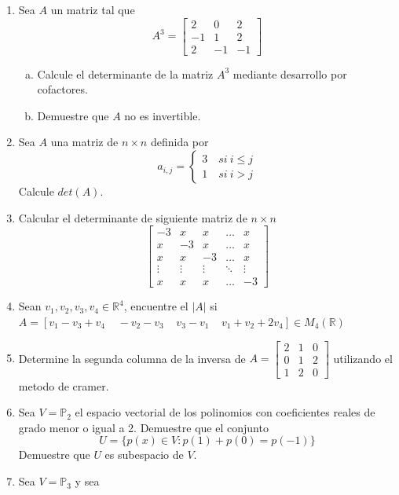 \documentclass[12pt]{article}
\newenvironment{preguntas}
{\begin{enumerate}\itemsep12pt
	}
	{
	\end{enumerate}
}
\newcommand{\ra}{\rightarrow}
\newcommand{\R}{\mathbb{R}}
\begin{document}
\begin{preguntas}
\begin{enumerate}[a)]
\item Se define $T: \R^3 \ra \R^3$ como la transformación lineal definida por $$T(x,y,z)=(x+y,y+z,x-z)$$
		Calcule el volumen de $T(P)$.
\end{enumerate}
\item Sea $A$ un matriz tal que
$$A^3 = 
\begin{bmatrix}
2 & 0 & 2\\
-1 & 1 & 2\\
2 & -1 & -1
\end{bmatrix}$$
\begin{enumerate}[a)]
\item Calcule el determinante de la matriz $A^3$ mediante desarrollo por cofactores.
\item Demuestre que $A$ no es invertible.
\end{enumerate}
\item Sea $A$ una matriz de $n \times n$ definida por
	$$a_{i,j} = 
	\begin{cases}
	3 \quad si\ i\leq j \\
	1 \quad si\ i > j
	\end{cases}$$
	Calcule $det(A)$.
\item Calcular el determinante de siguiente matriz de $n\times n$
	$$ \begin{bmatrix}
	-3 & x & x & \dots & x \\
	x & -3 & x & \dots & x \\
	x & x & -3 & \dots & x \\
	\vdots & \vdots & \vdots & \ddots & \vdots \\
	x & x & x & \dots & -3
	\end{bmatrix}$$
\item Sean $v_1,v_2,v_3,v_4 \in \R^4$, encuentre el $|A|$ si\\
$A=[v_1-v_3+v_4 \;\;\;\;-v_2-v_3 \;\;\;\; v_3-v_1
\;\;\;\;v_1+v_2+2v_4 ]\in M_4 (\R)$
\item Determine la segunda columna de la inversa de $A = \left[ \begin{array}{rrr} 2&1&0\\ 0&1&2\\ 1&2&0 \end{array} \right]$ utilizando el metodo de cramer.
\item Sea $V = \mathbb{P}_2$ el espacio vectorial de los polinomios con coeficientes reales de grado menor o igual a 2. Demuestre que el conjunto
	$$U=\{p(x) \in V : p(1) + p(0) = p(-1)\}$$
	Demuestre que $U$ es subespacio de $V$.
\item Sea $V = \mathbb{P}_3$ y sea

\end{preguntas}
\end{document}
